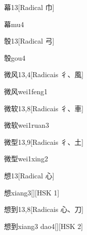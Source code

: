 \begin{entry}{幕}{13}[Radical ⼱]
  \begin{phonetics}{幕}{mu4}
  \end{phonetics}
\end{entry}

\begin{entry}{彀}{13}[Radical ⼸]
  \begin{phonetics}{彀}{gou4}
  \end{phonetics}
\end{entry}

\begin{entry}{微风}{13,4}[Radicais ⼻、⾵]
  \begin{phonetics}{微风}{wei1feng1}
  \end{phonetics}
\end{entry}

\begin{entry}{微软}{13,8}[Radicais ⼻、⾞]
  \begin{phonetics}{微软}{wei1ruan3}
  \end{phonetics}
\end{entry}

\begin{entry}{微型}{13,9}[Radicais ⼻、⼟]
  \begin{phonetics}{微型}{wei1xing2}
  \end{phonetics}
\end{entry}

\begin{entry}{想}{13}[Radical ⼼]
  \begin{phonetics}{想}{xiang3}[][HSK 1]
  \end{phonetics}
\end{entry}

\begin{entry}{想到}{13,8}[Radicais ⼼、⼑]
  \begin{phonetics}{想到}{xiang3 dao4}[][HSK 2]
  \end{phonetics}
\end{entry}

